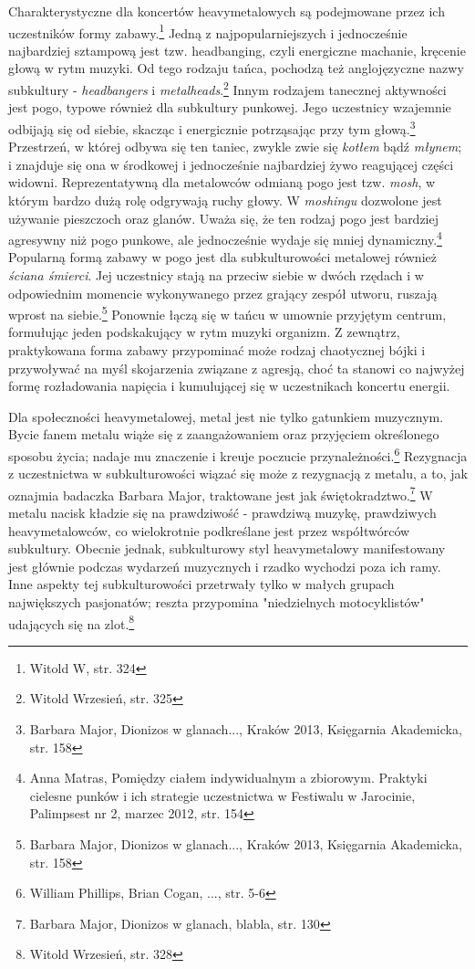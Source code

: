 \documentclass[12pt, a4paper, titlepage]{report}
\begin{document}
Charakterystyczne dla koncertów heavymetalowych są podejmowane przez ich uczestników formy zabawy.\footnote{Witold W, str. 324} Jedną z najpopularniejszych i jednocześnie najbardziej sztampową jest tzw. headbanging, czyli energiczne machanie, kręcenie głową w rytm muzyki. Od tego rodzaju tańca, pochodzą też anglojęzyczne nazwy subkultury - \textit{headbangers} i \textit{metalheads}.\footnote{Witold Wrzesień, str. 325} Innym rodzajem tanecznej aktywności jest pogo, typowe również dla subkultury punkowej. Jego uczestnicy wzajemnie odbijają się od siebie, skacząc i energicznie potrząsając przy tym głową.\footnote{Barbara Major, Dionizos w glanach..., Kraków 2013, Księgarnia Akademicka, str. 158} Przestrzeń, w której odbywa się ten taniec, zwykle zwie się \textit{kotłem} bądź \textit{młynem}; i znajduje się ona w środkowej i jednocześnie najbardziej żywo reagującej części widowni. Reprezentatywną dla metalowców odmianą pogo jest tzw. \textit{mosh}, w którym bardzo dużą rolę odgrywają ruchy głowy. W \textit{moshingu} dozwolone jest używanie pieszczoch oraz glanów. Uważa się, że ten rodzaj pogo jest bardziej agresywny niż pogo punkowe, ale jednocześnie wydaje się mniej dynamiczny.\footnote{Anna Matras, Pomiędzy ciałem indywidualnym a zbiorowym. Praktyki cielesne punków i ich strategie uczestnictwa w Festiwalu w Jarocinie, Palimpsest nr 2, marzec 2012, str. 154} Popularną formą zabawy w pogo jest dla subkulturowości metalowej również \textit{ściana śmierci}. Jej uczestnicy stają na przeciw siebie w dwóch rzędach i w odpowiednim momencie wykonywanego przez grający zespół utworu, ruszają wprost na siebie.\footnote{Barbara Major, Dionizos w glanach..., Kraków 2013, Księgarnia Akademicka, str. 158} Ponownie łączą się w tańcu w umownie przyjętym centrum, formułując jeden podskakujący w rytm muzyki organizm. Z zewnątrz, praktykowana forma zabawy przypominać może rodzaj chaotycznej bójki i przywoływać na myśl skojarzenia związane z agresją, choć ta stanowi co najwyżej formę rozładowania napięcia i kumulującej się w uczestnikach koncertu energii. 

Dla społeczności heavymetalowej, metal jest nie tylko gatunkiem muzycznym. Bycie fanem metalu wiąże się z zaangażowaniem oraz przyjęciem określonego sposobu życia; nadaje mu znaczenie i kreuje poczucie przynależności.\footnote{William Phillips, Brian Cogan, ..., str. 5-6} Rezygnacja z uczestnictwa w subkulturowości wiązać się może z rezygnacją z metalu, a to, jak oznajmia badaczka Barbara Major, traktowane jest jak świętokradztwo.\footnote{Barbara Major, Dionizos w glanach, blabla, str. 130} W metalu nacisk kładzie się na prawdziwość - prawdziwą muzykę, prawdziwych heavymetalowców, co wielokrotnie podkreślane jest przez współtwórców subkultury. Obecnie jednak, subkulturowy styl heavymetalowy manifestowany jest głównie podczas wydarzeń muzycznych i rzadko wychodzi poza ich ramy. Inne aspekty tej subkulturowości przetrwały tylko w małych grupach największych pasjonatów; reszta przypomina "niedzielnych motocyklistów" udających się na zlot.\footnote{Witold Wrzesień, str. 328}
\end{document}
